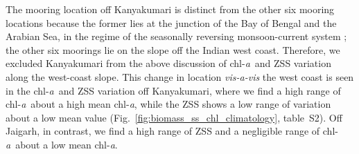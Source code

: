 \documentclass[authoryear,review,11pt]{elsarticle}
\newcommand{\chla}{chl-{\emph{a}}}
\begin{document}
The mooring location off Kanyakumari is distinct from the other six mooring locations because the former lies at the junction of the Bay of Bengal and the Arabian Sea, in the regime of the seasonally reversing monsoon-current system \citep{shankar2002monsoon}; the other six moorings lie on the slope off the Indian west coast. Therefore, we excluded Kanyakumari from the above discussion of \chla\ and ZSS variation along the west-coast slope. This change in location \emph{vis-a-vis} the west coast is seen in the \chla\ and ZSS variation off Kanyakumari, where we find a high range of \chla\ about a high mean \chla, while the ZSS shows a low range of variation about a low mean value (Fig.~\ref{fig:biomass_ss_chl_climatology}, table~S2).  Off Jaigarh, in contrast, we find a high range of ZSS and a negligible range of \chla\ about a low mean \chla.
\end{document}
